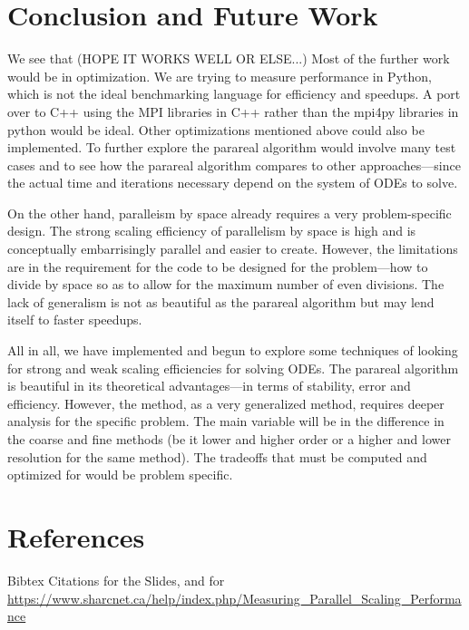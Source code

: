 \documentclass[letterpaper,11pt]{article}
\begin{document}
\section{Conclusion and Future Work}

We see that (HOPE IT WORKS WELL OR ELSE...) Most of the further work would be in
optimization. We are trying to measure performance in Python, which is not the
ideal benchmarking language for efficiency and speedups. A port over to C++
using the MPI libraries in C++ rather than the mpi4py libraries in python would
be ideal. Other optimizations mentioned above could also be implemented. To
further explore the parareal algorithm would involve many test cases and to see
how the parareal algorithm compares to other approaches---since the actual time
and iterations necessary depend on the system of ODEs to solve.

On the other hand, paralleism by space already requires a very problem-specific
design. The strong scaling efficiency of parallelism by space is high and is
conceptually embarrisingly parallel and easier to create. However, the
limitations are in the requirement for the code to be designed for the
problem---how to divide by space so as to allow for the maximum number of even
divisions. The lack of generalism is not as beautiful as the parareal algorithm
but may lend itself to faster speedups.

All in all, we have implemented and begun to explore some techniques of looking
for strong and weak scaling efficiencies for solving ODEs. The parareal
algorithm is beautiful in its theoretical advantages---in terms of stability,
error and efficiency. However, the method, as a very generalized method,
requires deeper analysis for the specific problem. The main variable will be in
the difference in the coarse and fine methods (be it lower and higher order or a
higher and lower resolution for the same method). The tradeoffs that must be
computed and optimized for would be problem specific.

\section{References}

Bibtex Citations for the Slides, and for \url{https://www.sharcnet.ca/help/index.php/Measuring_Parallel_Scaling_Performance}
\end{document}
